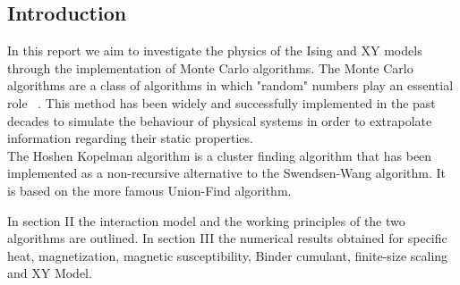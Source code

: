 \documentclass[twoside]{article}
\begin{document}
\begin{multicols}{2} %

\section{Introduction}
In this report we aim to investigate the physics of the Ising and XY models through the implementation of Monte Carlo algorithms.
The Monte Carlo algorithms are a class of algorithms in which "random" numbers play an essential role ~\cite{thijssen}. This method has been widely and successfully implemented in the past decades to simulate the behaviour of physical systems in order to extrapolate information regarding their static properties. \\
The Hoshen Kopelman algorithm is a cluster finding algorithm that has been implemented as a non-recursive alternative to the Swendsen-Wang algorithm. It is based on the more famous Union-Find algorithm.

In section II the interaction model and the working principles of the two algorithms are outlined. In section III the numerical results obtained for specific heat, magnetization, magnetic susceptibility, Binder cumulant, finite-size scaling and XY Model.


\end{multicols}
\end{document}
